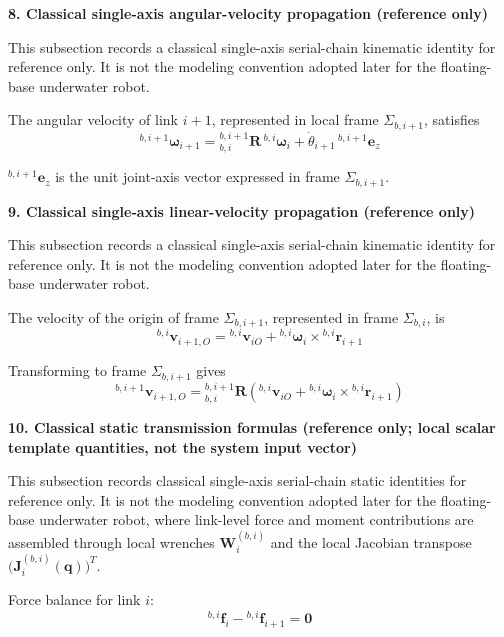 \documentclass[12pt,a4paper]{report}
\newcommand{\newsymbols}[1]{\par\noindent{}#1\par\vspace{0.35em}}
\newcommand{\vect}[1]{\mathbf{#1}}
\newcommand{\mat}[1]{\mathbf{#1}}
\newcommand{\Frame}[1]{\Sigma_{#1}}
\newcommand{\angvel}{\boldsymbol{\omega}}
\begin{document}
\textbf{8. Classical single-axis angular-velocity propagation (reference only)}

This subsection records a classical single-axis serial-chain kinematic identity for reference only. It is not the modeling convention adopted later for the floating-base underwater robot.

The angular velocity of link $i+1$, represented in local frame $\Frame{b,i+1}$, satisfies
\begin{equation}
{}^{b,i+1}\angvel_{i+1}
=
{}_{b,i}^{b,i+1}\mat{R}\,{}^{b,i}\angvel_{i}
+
\dot{\theta}_{i+1}\,{}^{b,i+1}\vect{e}_{z}
\end{equation}
\newsymbols{${}^{b,i+1}\vect{e}_{z}$ is the unit joint-axis vector expressed in frame $\Frame{b,i+1}$.}

\textbf{9. Classical single-axis linear-velocity propagation (reference only)}

This subsection records a classical single-axis serial-chain kinematic identity for reference only. It is not the modeling convention adopted later for the floating-base underwater robot.

The velocity of the origin of frame $\Frame{b,i+1}$, represented in frame $\Frame{b,i}$, is
\begin{equation}
{}^{b,i}\vect{v}_{i+1,O}
=
{}^{b,i}\vect{v}_{iO}
+
{}^{b,i}\angvel_{i} \times {}^{b,i}\vect{r}_{i+1}
\end{equation}

Transforming to frame $\Frame{b,i+1}$ gives
\begin{equation}
{}^{b,i+1}\vect{v}_{i+1,O}
=
{}_{b,i}^{b,i+1}\mat{R}
\left(
{}^{b,i}\vect{v}_{iO}
+
{}^{b,i}\angvel_{i} \times {}^{b,i}\vect{r}_{i+1}
\right)
\end{equation}

\textbf{10. Classical static transmission formulas (reference only; local scalar template quantities, not the system input vector)}

This subsection records classical single-axis serial-chain static identities for reference only. It is not the modeling convention adopted later for the floating-base underwater robot, where link-level force and moment contributions are assembled through local wrenches $\mathbf{W}_i^{(b,i)}$ and the local Jacobian transpose $\bigl(\mathbf{J}_i^{(b,i)}(\mathbf{q})\bigr)^T$.

Force balance for link $i$:
\begin{equation}
{}^{b,i}\vect{f}_{i} - {}^{b,i}\vect{f}_{i+1} = \vect{0}
\end{equation}
\end{document}
